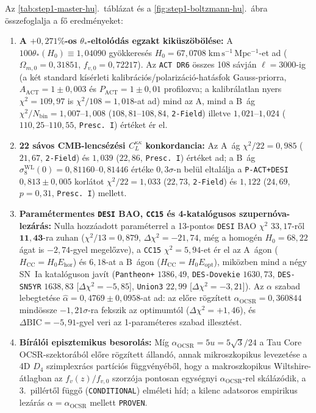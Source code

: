 \documentclass[11pt,a4paper]{article}
\begin{document}
Az \ref{tab:step1-master-hu}.~táblázat és a \ref{fig:step1-boltzmann-hu}.~ábra összefoglalja a fő eredményeket:
\begin{enumerate}
    \item \textbf{A $+0{,}271\%$-os $\theta_*$-eltolódás egzakt kiküszöbölése:} A $100\theta_*(H_0) \equiv 1{,}04090$ gyökkeresés $H_0 = 67{,}0708\;\mathrm{km\,s^{-1}\,Mpc^{-1}}$-et ad ($\Omega_{m,0} = 0{,}31851$, $f_{v,0} = 0{,}72217$). Az \texttt{ACT DR6} összes 108 sávján $\ell = 3000$-ig (a két standard kísérleti kalibrációs/polarizáció-hatásfok Gauss-priorra, $A_{\mathrm{ACT}} = 1 \pm 0{,}003$ és $P_{\mathrm{ACT}} = 1 \pm 0{,}01$ profilozva; a kalibrálatlan nyers $\chi^2 = 109{,}97$ is $\chi^2/108 = 1{,}018$-at ad) mind az A, mind a B~ág $\chi^2/N_{\mathrm{bin}} = 1{,}007\text{--}1{,}008$ ($108{,}81\text{--}108{,}84$, \texttt{2-Field}) illetve $1{,}021\text{--}1{,}024$ ($110{,}25\text{--}110{,}55$, \texttt{Presc.~I}) értéket ér el.
    \item \textbf{22 sávos CMB-lencsézési $C_L^{\kappa\kappa}$ konkordancia:} Az A~ág $\chi^2/22 = 0{,}985$ ($21{,}67$, \texttt{2-Field}) és $1{,}039$ ($22{,}86$, \texttt{Presc.~I}) értéket ad; a B~ág $\sigma_8^{\mathrm{WL}}(0) = 0{,}81160\text{--}0{,}81446$ értéke $0{,}3\sigma$-n belül eltalálja a \texttt{P-ACT+DESI} $0{,}813 \pm 0{,}005$ korlátot $\chi^2/22 = 1{,}033$ ($22{,}73$, \texttt{2-Field}) és $1{,}122$ ($24{,}69$, $p = 0{,}31$, \texttt{Presc.~I}) mellett.
    \item \textbf{Paramétermentes \texttt{DESI} BAO, \texttt{CC15} és 4-katalógusos szupernóva-lezárás:} Nulla hozzáadott paraméterrel a 13-pontos \texttt{DESI} BAO $\chi^2$ $33{,}17$-ről $\mathbf{11{,}43}$-ra zuhan ($\chi^2/13 = 0{,}879$, $\Delta\chi^2 = -21{,}74$, még a homogén $H_0 = 68{,}22$ ágat is $-2{,}74$-gyel megelőzve), a \texttt{CC15} $\chi^2 = 5{,}94$-et ér el az A~ágon ($H_{\mathrm{CC}} = H_0 E_{\mathrm{hor}}$) és $6{,}18$-at a B~ágon ($H_{\mathrm{CC}} = H_0 E_{\mathrm{opt}}$), miközben mind a négy SN~Ia katalóguson javít (\texttt{Pantheon+} $1386{,}49$, \texttt{DES-Dovekie} $1630{,}73$, \texttt{DES-SN5YR} $1638{,}83$ [$\Delta\chi^2 = -5{,}85$], \texttt{Union3} $22{,}99$ [$\Delta\chi^2 = -3{,}21$]). Az $\alpha$ szabad lebegtetése $\hat{\alpha} = 0{,}4769 \pm 0{,}0958$-at ad: az előre rögzített $\alpha_{\mathrm{OCSR}} = 0{,}360844$ mindössze $-1{,}21\sigma$-ra fekszik az optimumtól ($\Delta\chi^2 = +1{,}46$), és $\Delta\mathrm{BIC} = -5{,}91$-gyel veri az 1-paraméteres szabad illesztést.
    \item \textbf{Bírálói episztemikus besorolás:} Míg $\alpha_{\mathrm{OCSR}} = 5u = 5\sqrt{3}/24$ a Tau Core OCSR-szektorából előre rögzített állandó, annak mikroszkopikus levezetése a 4D $D_4$ szimplexrács partíciós függvényéből, hogy a makroszkopikus Wiltshire-átlagban az $f_v(z)/f_{v,0}$ szorzója pontosan egységnyi $\alpha_{\mathrm{OCSR}}$-rel skálázódik, a 3.~pillértől függő (\texttt{CONDITIONAL}) elméleti híd; a kilenc adatsoros empirikus lezárás $\alpha = \alpha_{\mathrm{OCSR}}$ mellett \texttt{PROVEN}.
\end{enumerate}
\end{document}
